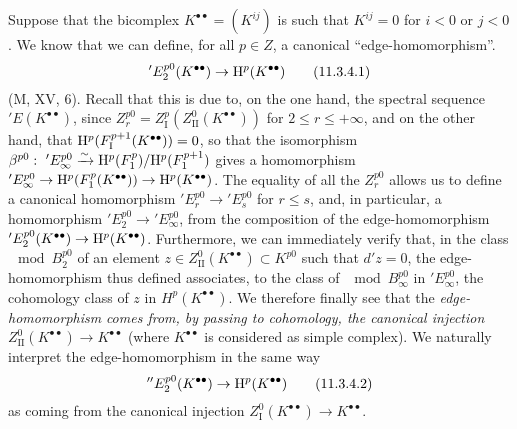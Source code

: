 \begin{env}[11.3.4]
\label{0.11.3.4}
Suppose that the bicomplex $K^{\bullet\bullet}=(K^{ij})$ is such that $K^{ij}=0$ for $i<0$ or $j<0$.
We know that we can define, for all $p \in Z$, a canonical ``edge-homomorphism''.
\[
\label{0.11.3.4.1}
  'E_2^{p0}(K^{\bullet\bullet})
  \rightarrow \mathrm{H}^{p}(K^{\bullet\bullet})
\tag{11.3.4.1}
\]
(M, XV, 6).
Recall that this is due to, on the one hand, the spectral sequence
$'E(K^{\bullet\bullet})$, since $Z_r^{p0}=Z_{\mathrm{I}}^{p}(Z_{\mathrm{II}}^{0}(K^{\bullet\bullet}))$ for $2\leq r \leq +\infty$, and on the other hand, that $\mathrm{H}^{p}(F_\mathrm{I}^{p+1}(K^{\bullet\bullet})) = 0$, so that the isomorphism $\beta^{p0}:\ 'E_\infty^{p0} \xrightarrow{\sim} \mathrm{H}^{p}(F_1^p)/\mathrm{H}^{p}(F_1^{p+1})$ gives a homomorphism $'E_\infty^{p0} \rightarrow \mathrm{H}^{p}(F_1^p(K^{\bullet\bullet})) \rightarrow \mathrm{H}^{p}(K^{\bullet\bullet})$.
The equality of all the $Z_r^{p0}$ allows us to define a canonical homomorphism $'E_r^{p0} \rightarrow 'E_s^{p0}$ for $r \leq s$, and, in particular, a homomorphism $'E_2^{p0} \rightarrow 'E_\infty^{p0}$, from the composition of the edge-homomorphism $'E_2^{p0}(K^{\bullet\bullet}) \rightarrow \mathrm{H}^{p}(K^{\bullet\bullet})$.
Furthermore, we can immediately verify that, in the class $\mod B_2^{p0}$ of an element $z \in Z_\mathrm{II}^0(K^{\bullet\bullet}) \subset K^{p0}$ such that $d'z=0$, the edge-homomorphism thus defined associates, to the class of $\mod B_\infty^{p0}$ in $'E_{\infty}^{p0}$, the cohomology class of $z$ in $H^p(K^{\bullet\bullet})$.
We therefore finally see that the \emph{edge-homomorphism}  \emph{comes from, by passing to cohomology, the canonical injection} $Z_\mathrm{II}^0(K^{\bullet\bullet}) \rightarrow K^{\bullet\bullet}$  (where $K^{\bullet\bullet}$ is considered as simple complex).
We naturally interpret the edge-homomorphism in the same way 
\[
\label{0.11.3.4.2}
  ''E_2^{p0}(K^{\bullet\bullet})
  \rightarrow \mathrm{H}^{p}(K^{\bullet\bullet})
\tag{11.3.4.2}
\]
as coming from the canonical injection $Z_\mathrm{I}^0(K^{\bullet\bullet}) \rightarrow K^{\bullet\bullet}$.
\end{env}

